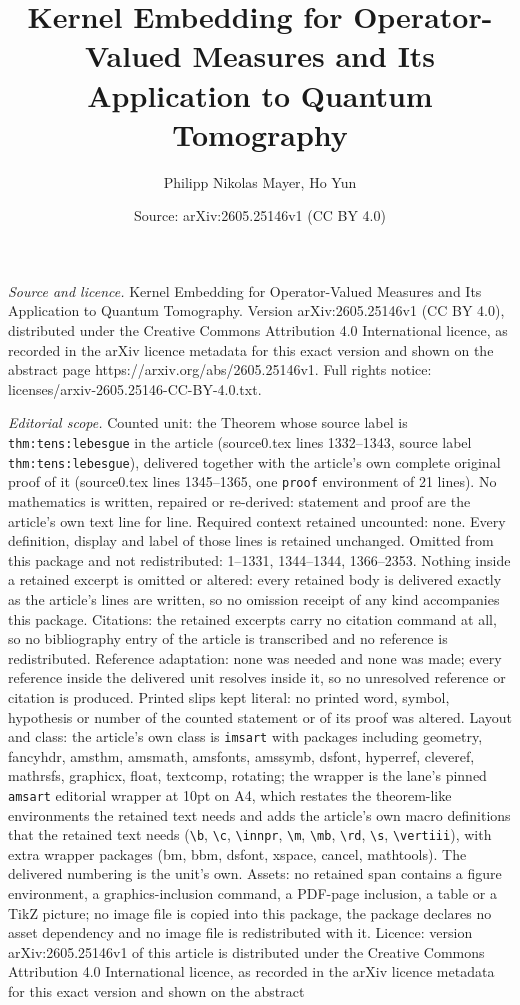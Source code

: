 \documentclass[10pt,a4paper]{amsart}
\title[Kernel Embedding for Operator-Valued Measures and Its Applic]{Kernel Embedding for Operator-Valued Measures and Its Application to Quantum Tomography}
\author{Philipp Nikolas Mayer, Ho Yun}
\date{Source: arXiv:2605.25146v1 (CC BY 4.0)}
\begin{document}
\maketitle

\noindent\emph{Source and licence.} Kernel Embedding for Operator-Valued Measures and Its Application to Quantum Tomography. Version arXiv:2605.25146v1 (CC BY 4.0), distributed under the Creative Commons Attribution 4.0 International licence, as recorded in the arXiv licence metadata for this exact version and shown on the abstract page https://arxiv.org/abs/2605.25146v1. Full rights notice: licenses/arxiv-2605.25146-CC-BY-4.0.txt.\par\smallskip

\noindent\textit{Editorial scope.} Counted unit: the Theorem whose source label is \texttt{thm:tens:lebesgue} in the article (source0.tex lines 1332--1343, source label \texttt{thm:tens:lebesgue}), delivered together with the article's own complete original proof of it (source0.tex lines 1345--1365, one \texttt{proof} environment of 21 lines). No mathematics is written, repaired or re-derived: statement and proof are the article's own text line for line. Required context retained uncounted: none. Every definition, display and label of those lines is retained unchanged. Omitted from this package and not redistributed: 1--1331, 1344--1344, 1366--2353. Nothing inside a retained excerpt is omitted or altered: every retained body is delivered exactly as the article's lines are written, so no omission receipt of any kind accompanies this package. Citations: the retained excerpts carry no citation command at all, so no bibliography entry of the article is transcribed and no reference is redistributed. Reference adaptation: none was needed and none was made; every reference inside the delivered unit resolves inside it, so no unresolved reference or citation is produced. Printed slips kept literal: no printed word, symbol, hypothesis or number of the counted statement or of its proof was altered. Layout and class: the article's own class is \texttt{imsart} with packages including geometry, fancyhdr, amsthm, amsmath, amsfonts, amssymb, dsfont, hyperref, cleveref, mathrsfs, graphicx, float, textcomp, rotating; the wrapper is the lane's pinned \texttt{amsart} editorial wrapper at 10pt on A4, which restates the theorem-like environments the retained text needs and adds the article's own macro definitions that the retained text needs (\texttt{\textbackslash b}, \texttt{\textbackslash c}, \texttt{\textbackslash innpr}, \texttt{\textbackslash m}, \texttt{\textbackslash mb}, \texttt{\textbackslash rd}, \texttt{\textbackslash s}, \texttt{\textbackslash vertiii}), with extra wrapper packages (bm, bbm, dsfont, xspace, cancel, mathtools). The delivered numbering is the unit's own. Assets: no retained span contains a figure environment, a graphics-inclusion command, a PDF-page inclusion, a table or a TikZ picture; no image file is copied into this package, the package declares no asset dependency and no image file is redistributed with it. Licence: version arXiv:2605.25146v1 of this article is distributed under the Creative Commons Attribution 4.0 International licence, as recorded in the arXiv licence metadata for this exact version and shown on the abstract 
\end{document}
